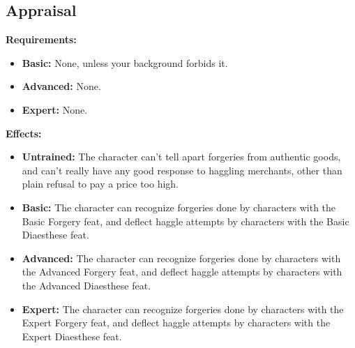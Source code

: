 \subsection{Appraisal}
\begin{table}[!ht]
\centering
{}
\end{table}
\textbf{Requirements:}
\begin{itemize}
	\item \textbf{Basic:} None, unless your background forbids it.
	\item \textbf{Advanced:} None.
	\item \textbf{Expert:} None.
\end{itemize}
\textbf{Effects:}
\begin{itemize}
	\item \textbf{Untrained:} The character can't tell apart forgeries from authentic goods, and can't really have any good response to haggling merchants, other than plain refusal to pay a price too high.
	\item \textbf{Basic:} The character can recognize forgeries done by characters with the Basic Forgery feat, and deflect haggle attempts by characters with the Basic Diaesthese feat.
	\item \textbf{Advanced:} The character can recognize forgeries done by characters with the Advanced Forgery feat, and deflect haggle attempts by characters with the Advanced Diaesthese feat.
	\item \textbf{Expert:} The character can recognize forgeries done by characters with the Expert Forgery feat, and deflect haggle attempts by characters with the Expert Diaesthese feat.
\end{itemize}\newpage
